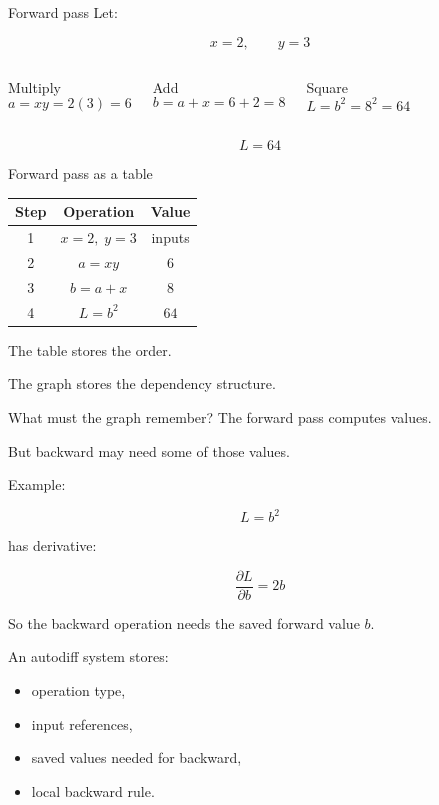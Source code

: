 \documentclass[10pt,aspectratio=169]{beamer}
\newcommand{\grad}[2]{\frac{\partial #1}{\partial #2}}
\begin{document}
\begin{frame}[t]{Forward pass}
Let:

\[
x=2,\qquad y=3
\]

\begin{columns}[T]
\begin{block}{Multiply}
\[
a=xy=2(3)=6
\]
\end{block}

\begin{block}{Add}
\[
b=a+x=6+2=8
\]
\end{block}

\begin{block}{Square}
\[
L=b^2=8^2=64
\]
\end{block}
\end{columns}

\vfill

\[
\boxed{L=64}
\]
\end{frame}

\begin{frame}[t]{Forward pass as a table}
\centering
\small

\begin{tabular}{c c c}
\toprule
Step & Operation & Value \\
\midrule
1 & \(x=2,\;y=3\) & inputs \\
2 & \(a=xy\) & \(6\) \\
3 & \(b=a+x\) & \(8\) \\
4 & \(L=b^2\) & \(64\) \\
\bottomrule
\end{tabular}

\vspace{0.5cm}

The table stores the order.

The graph stores the dependency structure.
\end{frame}

\begin{frame}[t]{What must the graph remember?}
The forward pass computes values.

But backward may need some of those values.

Example:

\[
L=b^2
\]

has derivative:

\[
\grad{L}{b}=2b
\]

So the backward operation needs the saved forward value \(b\).

\vfill

An autodiff system stores:
\begin{itemize}
    \item operation type,
    \item input references,
    \item saved values needed for backward,
    \item local backward rule.
\end{itemize}
\end{frame}
\end{document}
